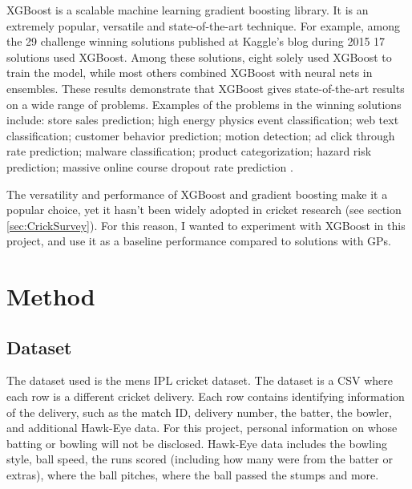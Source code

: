 \documentclass[12pt,a4paper]{report}
\theoremstyle{definition}
\begin{document}
XGBoost is a scalable machine learning gradient boosting library.  
It is an extremely popular, versatile and state-of-the-art technique.
For example, among the 29 challenge winning solutions published at Kaggle’s blog during 2015 17 solutions used XGBoost.
Among these solutions, eight solely used XGBoost to train the model, while most others combined XGBoost with neural nets in ensembles.
These results demonstrate that XGBoost gives state-of-the-art results on a wide range of problems. 
Examples of the problems in the winning solutions include: store sales prediction; high energy physics event classification; web text classification; customer behavior prediction; motion detection; ad click through rate prediction; malware classification; product categorization; hazard risk prediction; massive online course dropout rate prediction \citep{Chen2016}.

The versatility and performance of XGBoost and gradient boosting make it a popular choice, yet it hasn't been widely adopted in cricket research (see section \ref{sec:CrickSurvey}).
For this reason, I wanted to experiment with XGBoost in this project, and use it as a baseline performance compared to solutions with GPs.

\chapter{Method} \label{chap:Method}

\section{Dataset} \label{sec:Dataset}

The dataset used is the mens IPL cricket dataset. 
The dataset is a CSV where each row is a different cricket delivery. 
Each row contains identifying information of the delivery, such as the match ID, delivery number, the batter, the bowler, and additional Hawk-Eye data.
For this project, personal information on whose batting or bowling will not be disclosed. 
Hawk-Eye data includes the bowling style, ball speed, the runs scored (including how many were from the batter or extras), where the ball pitches, where the ball passed the stumps and more.     
\end{document}
